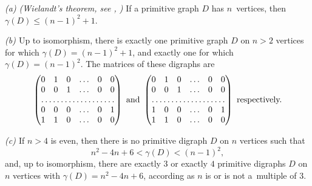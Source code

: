 \documentclass[11pt]{llncs}
\begin{document}
\begin{theorem}
\label{dulmage}
\emph{(a) (Wielandt's theorem, see \cite{Wi50,DM62}, \cite[Theorem~1]{DM64})}
If a primitive graph $D$ has $n$~vertices, then  $\gamma(D)\le(n-1)^2+1$.

\emph{(b) \cite[Theorem~6 and Corollary 4]{DM64}} Up to isomorphism, there is
exactly one primitive graph $D$ on $n>2$ vertices for which $\gamma(D)=(n-1)^2+1$,
and exactly one for which $\gamma(D)=(n-1)^2$. The matrices of these digraphs
are
\begin{equation}
\label{wielandt}
\begin{pmatrix}
0 & 1 & 0 & \dots & 0 & 0\\
0 & 0 & 1 & \dots & 0 & 0\\
\hdotsfor{6}\\
0 & 0 & 0 & \dots & 0 & 1\\
1 & 1 & 0 & \dots & 0 & 0
\end{pmatrix} \text{ and }
\begin{pmatrix}
0 & 1 & 0 & \dots & 0 & 0\\
0 & 0 & 1 & \dots & 0 & 0\\
\hdotsfor{6}\\
1 & 0 & 0 & \dots & 0 & 1\\
1 & 1 & 0 & \dots & 0 & 0
\end{pmatrix}
\text{ respectively.}
\end{equation}

\emph{(c) \cite[Theorem~7]{DM64}} If $n>4$ is even, then there is no
primitive digraph $D$ on $n$ vertices such that
\begin{equation}
\label{even gap}
n^2-4n+6<\gamma(D)<(n-1)^2,
\end{equation}
and, up to isomorphism, there are exactly $3$ or exactly $4$ primitive
digraphs $D$ on $n$ vertices with $\gamma(D)=n^2-4n+6$, according
as $n$ is or is not a~multiple of $3$.


\end{theorem}
\end{document}
